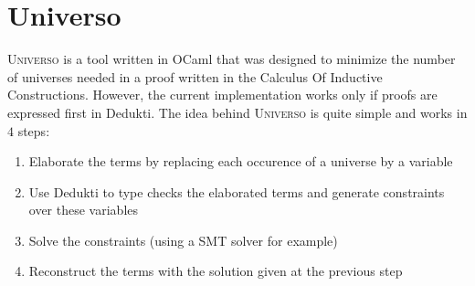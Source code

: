\documentclass[conference]{IEEEtran}
\newcommand{\universo}{\textsc{Universo}}
\begin{document}


\section{Universo}

\universo{} is a tool written in OCaml that was designed to minimize the number of universes needed in a proof written in the Calculus Of Inductive Constructions. However, the current implementation works only if proofs are expressed first in Dedukti. The idea behind \universo{} is quite simple and works in \(4\) steps:
\begin{enumerate}
\item Elaborate the terms by replacing each occurence of a universe by a variable
\item Use Dedukti to type checks the elaborated terms and generate constraints over these variables
\item Solve the constraints (using a SMT solver for example)
\item Reconstruct the terms with the solution given at the previous step
\end{enumerate}
\end{document}
